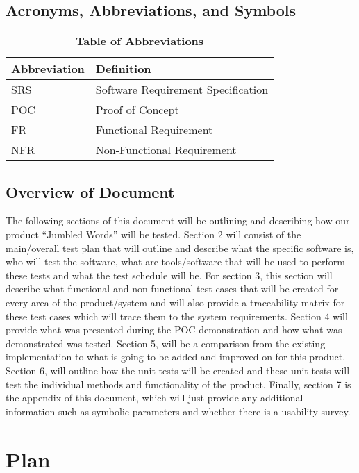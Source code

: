 \documentclass[12pt, titlepage]{article}
\begin{document}
\subsection{Acronyms, Abbreviations, and Symbols}
	
\begin{table}[hbp]
\caption{\textbf{Table of Abbreviations}} \label{Table}

\begin{tabularx}{\textwidth}{p{3cm}X}
\toprule
\textbf{Abbreviation} & \textbf{Definition} \\
\midrule
SRS & Software Requirement Specification\\
POC & Proof of Concept\\
FR & Functional Requirement\\
NFR & Non-Functional Requirement\\

\bottomrule
\end{tabularx}

\end{table}


\subsection{Overview of Document}

The following sections of this document will be outlining and describing how our product “Jumbled Words” will be tested. Section 2 will consist of the main/overall test plan that will outline and describe what the specific software is, who will test the software, what are tools/software that will be used to perform these tests and what the test schedule will be. For section 3, this section will describe what functional and non-functional test cases that will be created for every area of the product/system and will also provide a traceability matrix for these test cases which will trace them to the system requirements. Section 4 will provide what was presented during the POC demonstration and how what was demonstrated was tested. Section 5, will be a comparison from the existing implementation to what is going to be added and improved on for this product. Section 6, will outline how the unit tests will be created and these unit tests will test the individual methods and functionality of the product. Finally, section 7 is the appendix of this document, which will just provide any additional information such as symbolic parameters and whether there is a usability survey. 


\section{Plan}
	
\end{document}
